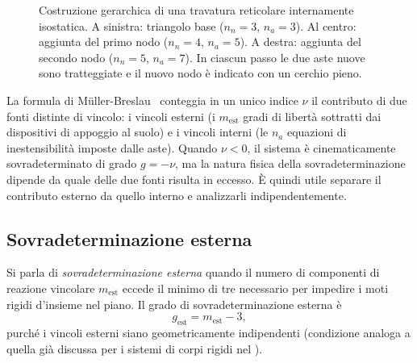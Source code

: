 \begin{oss}
\begin{figure}[htbp]
		\caption{Costruzione gerarchica di una travatura
			reticolare internamente isostatica.
			A sinistra: triangolo base ($n_n = 3$,
			$n_a = 3$). Al centro: aggiunta del primo
			nodo ($n_n = 4$, $n_a = 5$). A destra:
			aggiunta del secondo nodo ($n_n = 5$,
			$n_a = 7$). In ciascun passo le due aste
			nuove sono tratteggiate e il nuovo nodo è
			indicato con un cerchio pieno.}
		\label{fig:reticolare_gerarchia}
	\end{figure}
\end{oss}


La formula di M\"{u}ller-Breslau~
conteggia in un unico indice $\nu$ il contributo di
due fonti distinte di vincolo: i vincoli esterni
(i $m_\text{est}$ gradi di libertà sottratti dai
dispositivi di appoggio al suolo) e i vincoli interni
(le $n_a$ equazioni di inestensibilità imposte dalle
aste). Quando $\nu < 0$, il sistema è
cinematicamente sovradeterminato di grado $g = -\nu$,
ma la natura fisica della sovradeterminazione dipende
da quale delle due fonti risulta in eccesso.
È quindi utile separare il contributo esterno da
quello interno e analizzarli indipendentemente.


\subsection{Sovradeterminazione esterna}
\label{subsec:sovradet_est}

Si parla di \emph{sovradeterminazione esterna} quando
il numero di componenti di reazione vincolare
$m_\text{est}$ eccede il minimo di tre necessario
per impedire i moti rigidi d'insieme nel piano.
Il grado di sovradeterminazione esterna è
\begin{equation}\label{eq:g_est}
	g_\text{est} = m_\text{est} - 3,
\end{equation}
purché i vincoli esterni siano geometricamente
indipendenti (condizione analoga a quella già
discussa per i sistemi di corpi rigidi nel
).

